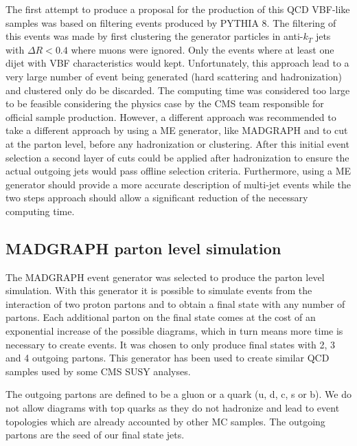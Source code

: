 The first attempt to produce a proposal for the production of this \gls{QCD} \gls{VBF}-like samples was based on filtering events produced by \textsc{PYTHIA 8}. The filtering of this events was made by first clustering the generator particles in anti-$k_T$ jets with $\Delta R<0.4$ where muons were ignored. Only the events where at least one dijet with \gls{VBF} characteristics would kept. Unfortunately, this approach lead to a very large number of event being generated (hard scattering and hadronization) and clustered only do be discarded. The computing time was considered too large to be feasible considering the physics case by the \gls{CMS} team responsible for official sample production. However, a different approach was recommended to take a different approach by using a \gls{ME} generator, like \textsc{MADGRAPH} and to cut at the parton level, before any hadronization or clustering. After this initial event selection a second layer of cuts could be applied after hadronization to ensure the actual outgoing jets would pass offline selection criteria. Furthermore, using a \gls{ME} generator should provide a more accurate description of multi-jet events while the two steps approach should allow a significant reduction of the necessary computing time. 

\subsection{\textsc{MADGRAPH} parton level simulation}
\label{SUBSECTION:RunIIPreparation_MadGraphPartonLevelSimulation}


The \textsc{MADGRAPH} event generator was selected to produce the parton level simulation. With this generator it is possible to simulate events from the interaction of two proton partons and to obtain a final state with any number of partons. Each additional parton on the final state comes at the cost of an exponential increase of the possible diagrams, which in turn means more time is necessary to create events. It was chosen to only produce final states with 2, 3 and 4 outgoing partons. This generator has been used to create similar \gls{QCD} samples used by some \gls{CMS} \gls{SUSY} analyses. 

The outgoing partons are defined to be a gluon or a quark (u, d, c, s or b). We do not allow diagrams with top quarks as they do not hadronize and lead to event topologies which are already accounted by other \gls{MC} samples. The outgoing partons are the seed of our final state jets. 

